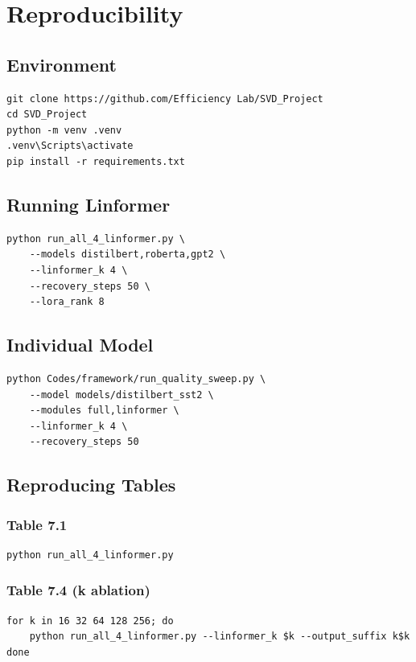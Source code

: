 \section{Reproducibility}

\subsection{Environment}

\begin{lstlisting}
git clone https://github.com/Efficiency Lab/SVD_Project
cd SVD_Project
python -m venv .venv
.venv\Scripts\activate
pip install -r requirements.txt
\end{lstlisting}

\subsection{Running Linformer}

\begin{lstlisting}
python run_all_4_linformer.py \
    --models distilbert,roberta,gpt2 \
    --linformer_k 4 \
    --recovery_steps 50 \
    --lora_rank 8
\end{lstlisting}

\subsection{Individual Model}

\begin{lstlisting}
python Codes/framework/run_quality_sweep.py \
    --model models/distilbert_sst2 \
    --modules full,linformer \
    --linformer_k 4 \
    --recovery_steps 50
\end{lstlisting}

\subsection{Reproducing Tables}

\subsubsection{Table 7.1}
\begin{lstlisting}
python run_all_4_linformer.py
\end{lstlisting}

\subsubsection{Table 7.4 (k ablation)}
\begin{lstlisting}
for k in 16 32 64 128 256; do
    python run_all_4_linformer.py --linformer_k $k --output_suffix k$k
done
\end{lstlisting}

